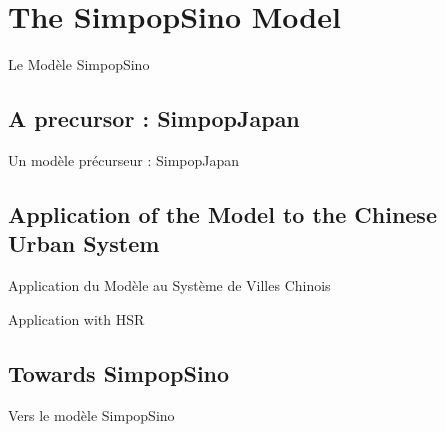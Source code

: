 





\section[The SimpopSino Model][Le Modèle SimpopSino]{The SimpopSino Model}{Le Modèle SimpopSino}



\subsection{A precursor : SimpopJapan}{Un modèle précurseur : SimpopJapan}















\subsection{Application of the Model to the Chinese Urban System}{Application du Modèle au Système de Villes Chinois}


Application with HSR









\subsection{Towards SimpopSino}{Vers le modèle SimpopSino}








